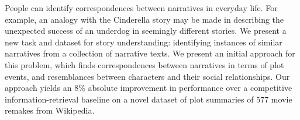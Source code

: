 People can identify correspondences between narratives in everyday life. For example, an analogy with the Cinderella story may be made in describing the unexpected success of an underdog in seemingly different stories. We present a new task and dataset for story understanding: identifying instances of similar narratives from a collection of narrative texts. We present an initial approach for this problem, which finds correspondences between narratives in terms of plot events, and resemblances between characters and their social relationships. Our approach yields an 8\% absolute improvement in performance over a competitive information-retrieval baseline on a novel dataset of plot summaries of 577 movie remakes from Wikipedia.

